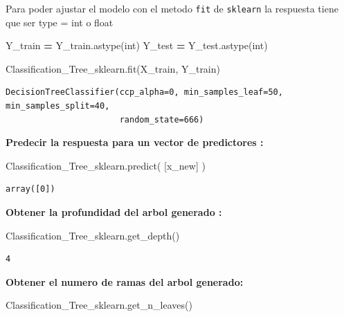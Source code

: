 \documentclass[
  11pt,
  a4paper,
]{article}
\newenvironment{Shaded}{\begin{snugshade}}{\end{snugshade}}
\newcommand{\NormalTok}[1]{#1}
\newcommand{\OperatorTok}[1]{\textcolor[rgb]{0.81,0.36,0.00}{\textbf{#1}}}
\newcommand{\StringTok}[1]{\textcolor[rgb]{0.31,0.60,0.02}{#1}}
\begin{document}
Para poder ajustar el modelo con el metodo \texttt{fit} de
\texttt{sklearn} la respuesta tiene que ser type = int o float

\begin{Shaded}
\begin{Highlighting}[]
\NormalTok{Y\_train }\OperatorTok{=}\NormalTok{ Y\_train.astype(}\StringTok{\textquotesingle{}int\textquotesingle{}}\NormalTok{)}
\NormalTok{Y\_test }\OperatorTok{=}\NormalTok{ Y\_test.astype(}\StringTok{\textquotesingle{}int\textquotesingle{}}\NormalTok{)}
\end{Highlighting}
\end{Shaded}

\begin{Shaded}
\begin{Highlighting}[]
\NormalTok{Classification\_Tree\_sklearn.fit(X\_train, Y\_train)}
\end{Highlighting}
\end{Shaded}

\begin{verbatim}
DecisionTreeClassifier(ccp_alpha=0, min_samples_leaf=50, min_samples_split=40,
                       random_state=666)
\end{verbatim}

\textbf{Predecir la respuesta para un vector de predictores :}

\begin{Shaded}
\begin{Highlighting}[]
\NormalTok{Classification\_Tree\_sklearn.predict( [x\_new] ) }
\end{Highlighting}
\end{Shaded}

\begin{verbatim}
array([0])
\end{verbatim}

\textbf{Obtener la profundidad del arbol generado :}

\begin{Shaded}
\begin{Highlighting}[]
\NormalTok{Classification\_Tree\_sklearn.get\_depth()}
\end{Highlighting}
\end{Shaded}

\begin{verbatim}
4
\end{verbatim}

\textbf{Obtener el numero de ramas del arbol generado:}

\begin{Shaded}
\begin{Highlighting}[]
\NormalTok{Classification\_Tree\_sklearn.get\_n\_leaves()}
\end{Highlighting}
\end{Shaded}
\end{document}
